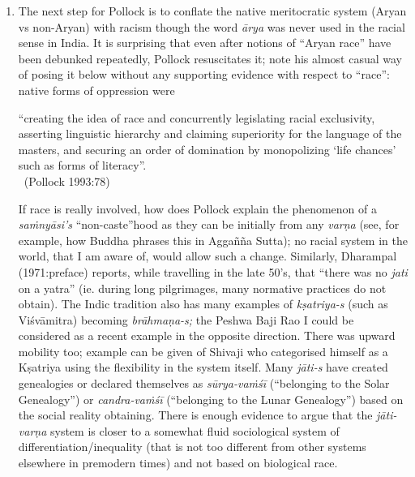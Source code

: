 {\begin{enumerate}
Without comparative data of Nazi sympathies in other disci\-plines, Pollock’s thesis on the role of German Indology in the holocaust is a house of cards; so too, his preposterous claim of Sanskrit ’s culpability. 

\item The next step for Pollock is to conflate the native meritocratic system (Aryan vs non-Aryan) with racism though the word {\sl ārya} was never used in the racial sense in India. It is surprising that even after notions of “Aryan race” have been debunked repeatedly, Pollock resuscitates it; note his almost casual way of posing it below without any supporting evidence with respect to “race”: native forms of oppression were 
\begin{myquote}
“creating the idea of race and concurrently legislating racial exclusivity, asserting linguistic hierarchy and claiming superiority for the language of the masters, and securing an order of domination by monopolizing ‘life chances’ such as forms of literacy”.\\[-15pt] 

~\hfill(Pollock 1993:78)
\end{myquote}

If race is really involved, how does Pollock explain the phenomenon of a {\sl saṁnyāsi’s} “non-caste”hood as they can be initially from any {\sl varṇa} (see, for example, how Buddha phrases this in Aggañña Sutta); no racial system in the world, that I am aware of, would allow such a change. Similarly, Dharampal (1971:preface) reports, while travelling in the late 50’s, that “there was no {\sl jati} on a yatra” (ie. during long pilgrimages, many normative practices do not obtain). The Indic tradition also has many examples of {\sl kṣatriya-s} (such as Viśvāmitra) becoming {\sl brāhmaṇa-s;} the Peshwa Baji Rao I could be considered as a recent example in the opposite direction. There was upward mobility too; example can be given of Shivaji who categorised himself as a Kṣatriya using the flexibility in the system itself. Many {\sl jāti-s} have created genealogies or declared themselves as {\sl sūrya-vaṁśī} (“belonging to the Solar Genealogy”) or {\sl candra-vaṁśī} (“belonging to the Lunar Genealogy”) based on the social reality obtaining. There is enough evidence to argue that the {\sl jāti-varṇa} system is closer to a somewhat fluid sociological system of differentiation/inequality (that is not too different from other systems elsewhere in premodern times) and not based on biological race. 


\end{enumerate}}
